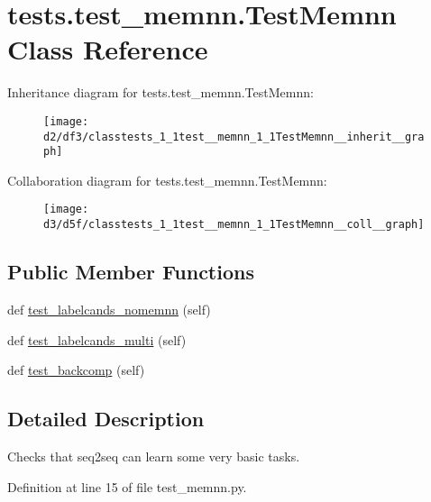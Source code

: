 \hypertarget{classtests_1_1test__memnn_1_1TestMemnn}{}\section{tests.\+test\+\_\+memnn.\+Test\+Memnn Class Reference}
\label{classtests_1_1test__memnn_1_1TestMemnn}


Inheritance diagram for tests.\+test\+\_\+memnn.\+Test\+Memnn\+:\nopagebreak
\begin{figure}[H]
\begin{center}
\leavevmode
\texttt{[image: d2/df3/classtests\_1\_1test\_\_memnn\_1\_1TestMemnn\_\_inherit\_\_graph]}
\end{center}
\end{figure}


Collaboration diagram for tests.\+test\+\_\+memnn.\+Test\+Memnn\+:\nopagebreak
\begin{figure}[H]
\begin{center}
\leavevmode
\texttt{[image: d3/d5f/classtests\_1\_1test\_\_memnn\_1\_1TestMemnn\_\_coll\_\_graph]}
\end{center}
\end{figure}
\subsection*{Public Member Functions}
\begin{DoxyCompactItemize}
\item 
def \hyperlink{classtests_1_1test__memnn_1_1TestMemnn_a3e3c10325fc7905dc77b8e1b1db4490a}{test\+\_\+labelcands\+\_\+nomemnn} (self)
\item 
def \hyperlink{classtests_1_1test__memnn_1_1TestMemnn_a2e52386c91c00701e4e58c72e100074d}{test\+\_\+labelcands\+\_\+multi} (self)
\item 
def \hyperlink{classtests_1_1test__memnn_1_1TestMemnn_a2c3a2e42a94e00651ee32a03d9b7ba84}{test\+\_\+backcomp} (self)
\end{DoxyCompactItemize}


\subsection{Detailed Description}
\begin{DoxyVerb}Checks that seq2seq can learn some very basic tasks.
\end{DoxyVerb}
 

Definition at line 15 of file test\+\_\+memnn.\+py.



